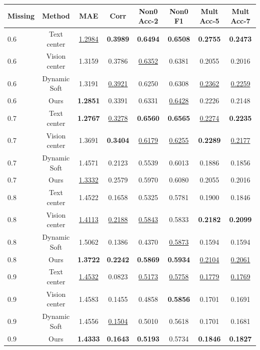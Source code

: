 \begin{table}[t]
\centering
\small
\begin{tabular}{lccccccc}
\toprule
Missing & Method & MAE & Corr & Non0 Acc-2 & Non0 F1 & Mult Acc-5 & Mult Acc-7 \\
\midrule
0.6 & Text center & \underline{1.2984} & \textbf{0.3989} & \textbf{0.6494} & \textbf{0.6508} & \textbf{0.2755} & \textbf{0.2473} \\
0.6 & Vision center & 1.3159 & 0.3786 & \underline{0.6352} & 0.6381 & 0.2055 & 0.2016 \\
0.6 & Dynamic Soft & 1.3191 & \underline{0.3921} & 0.6250 & 0.6308 & \underline{0.2362} & \underline{0.2259} \\
0.6 & Ours & \textbf{1.2851} & 0.3391 & 0.6331 & \underline{0.6428} & 0.2226 & 0.2148 \\
0.7 & Text center & \textbf{1.2767} & \underline{0.3278} & \textbf{0.6560} & \textbf{0.6565} & \underline{0.2274} & \textbf{0.2235} \\
0.7 & Vision center & 1.3691 & \textbf{0.3404} & \underline{0.6179} & \underline{0.6255} & \textbf{0.2289} & \underline{0.2177} \\
0.7 & Dynamic Soft & 1.4571 & 0.2123 & 0.5539 & 0.6013 & 0.1886 & 0.1856 \\
0.7 & Ours & \underline{1.3332} & 0.2579 & 0.5970 & 0.6080 & 0.2055 & 0.2016 \\
0.8 & Text center & 1.4522 & 0.1658 & 0.5325 & 0.5781 & 0.1900 & 0.1846 \\
0.8 & Vision center & \underline{1.4113} & \underline{0.2188} & \underline{0.5843} & 0.5833 & \textbf{0.2182} & \textbf{0.2099} \\
0.8 & Dynamic Soft & 1.5062 & 0.1386 & 0.4370 & \underline{0.5873} & 0.1594 & 0.1594 \\
0.8 & Ours & \textbf{1.3722} & \textbf{0.2242} & \textbf{0.5869} & \textbf{0.5934} & \underline{0.2104} & \underline{0.2061} \\
0.9 & Text center & \underline{1.4532} & 0.0823 & \underline{0.5173} & \underline{0.5758} & \underline{0.1779} & \underline{0.1769} \\
0.9 & Vision center & 1.4583 & 0.1455 & 0.4858 & \textbf{0.5856} & 0.1701 & 0.1691 \\
0.9 & Dynamic Soft & 1.4556 & \underline{0.1504} & 0.5010 & 0.5618 & 0.1701 & 0.1681 \\
0.9 & Ours & \textbf{1.4333} & \textbf{0.1643} & \textbf{0.5193} & 0.5734 & \textbf{0.1846} & \textbf{0.1827} \\

\end{tabular}
\end{table}
